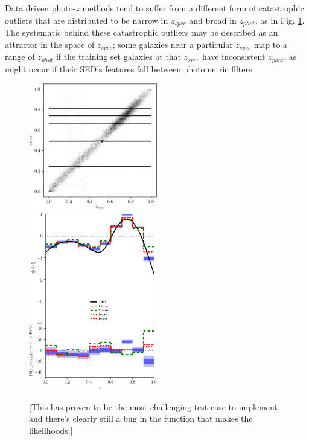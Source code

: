 \documentclass[iop]{emulateapj}
\begin{document}
Data driven photo-$z$ methods tend to suffer from a different form of catastrophic outliers that are distributed to be narrow in $z_{spec}$ and broad in $z_{phot}$, as in Fig. \ref{fig:traincatout}.  The systematic behind these catastrophic outliers may be described as an attractor in the space of $z_{spec}$; some galaxies near a particular $z_{spec}$ map to a range of $z_{phot}$ if the training set galaxies at that $z_{spec}$ have inconsistent $z_{phot}$, as might occur if their SED's features fall between photometric filters.

\begin{figure}
	\begin{center}
		\includegraphics[width=0.5\textwidth]{fig/training_outliers/scatter.png}\\
		\includegraphics[width=0.5\textwidth]{fig/training_outliers/estimators.png}	
		\caption{[This has proven to be the most challenging test case to implement, and there's clearly still a bug in the function that makes the likelihoods.]}
		\label{fig:traincatout}
	\end{center}
\end{figure}
\end{document}
